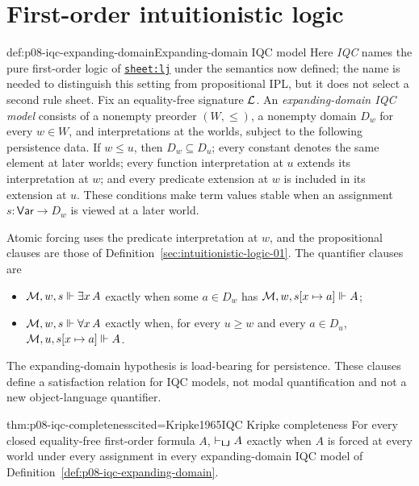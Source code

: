 \section{First-order intuitionistic logic}

\begin{hbdefinition}{def:p08-iqc-expanding-domain}{Expanding-domain IQC model}
Here \emph{IQC} names the pure first-order logic of
\hyperref[sheet:lj]{\texttt{sheet:lj}} under the semantics now defined; the
name is needed to distinguish this setting from propositional IPL, but it does
not select a second rule sheet.  Fix an equality-free signature \(\mathcal{L}\).
An \emph{expanding-domain IQC model} consists of a nonempty preorder
\((W,\leq)\), a nonempty domain \(D_w\) for every \(w\in W\), and
interpretations at the worlds, subject to the following persistence data.
If \(w\leq u\), then \(D_w\subseteq D_u\); every constant denotes the same
element at later worlds; every function interpretation at \(u\) extends its
interpretation at \(w\); and every predicate extension at \(w\) is included in
its extension at \(u\).  These conditions make term values stable when an
assignment \(s:\mathsf{Var}\to D_w\) is viewed at a later world.

Atomic forcing uses the predicate interpretation at \(w\), and the
propositional clauses are those of
Definition~\ref{sec:intuitionistic-logic-01}.  The quantifier clauses are

\begin{itemize}
\item \(\mathcal M,w,s\Vdash\exists x\,A\) exactly when some
  \(a\in D_w\) has
  \(\mathcal M,w,s[x\mapsto a]\Vdash A\);
\item \(\mathcal M,w,s\Vdash\forall x\,A\) exactly when, for every
  \(u\geq w\) and every \(a\in D_u\),
  \(\mathcal M,u,s[x\mapsto a]\Vdash A\).
\end{itemize}

The expanding-domain hypothesis is load-bearing for persistence.  These
clauses define a satisfaction relation for IQC models, not modal
quantification and not a new object-language quantifier.
\end{hbdefinition}

\begin{hbtheorem}{thm:p08-iqc-completeness}{cited=Kripke1965}{IQC Kripke completeness}
For every closed equality-free first-order formula \(A\),
\(\vdash_{\mathsf{LJ}}A\) exactly when \(A\) is forced at every world under
every assignment in every expanding-domain IQC model of
Definition~\ref{def:p08-iqc-expanding-domain}.
\end{hbtheorem}

